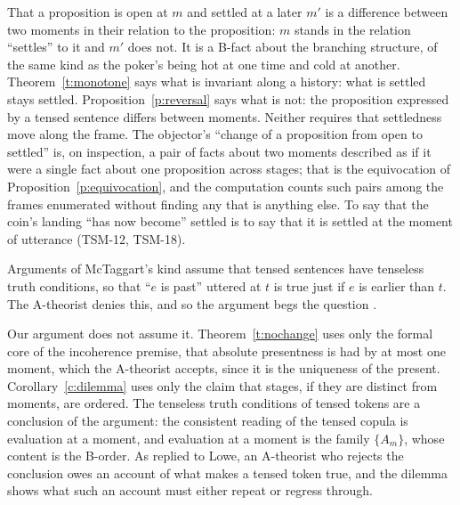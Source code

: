 \documentclass{situationist-preprint}
\begin{document}
\begin{reply}
That a proposition is open at $m$ and settled at a later $m'$ is a difference between two moments in their relation to the proposition: $m$ stands in the relation \enquote{settles} to it and $m'$ does not. It is a B-fact about the branching structure, of the same kind as the poker's being hot at one time and cold at another. Theorem~\ref{t:monotone} says what is invariant along a history: what is settled stays settled. Proposition~\ref{p:reversal} says what is not: the proposition expressed by a tensed sentence differs between moments. Neither requires that settledness move along the frame. The objector's \enquote{change of a proposition from open to settled} is, on inspection, a pair of facts about two moments described as if it were a single fact about one proposition across stages; that is the equivocation of Proposition~\ref{p:equivocation}, and the computation counts \NResolutions{} such pairs among the frames enumerated without finding any that is anything else. To say that the coin's landing \enquote{has now become} settled is to say that it is settled at the moment of utterance (TSM-12, TSM-18).
\end{reply}





\begin{objection}\label{o:lowe}
Arguments of McTaggart's kind assume that tensed sentences have tenseless truth conditions, so that \enquote{$e$ is past} uttered at $t$ is true just if $e$ is earlier than $t$. The A-theorist denies this, and so the argument begs the question \citep{Lowe1987}.
\end{objection}

\begin{reply}
Our argument does not assume it. Theorem~\ref{t:nochange} uses only the formal core of the incoherence premise, that absolute presentness is had by at most one moment, which the A-theorist accepts, since it is the uniqueness of the present. Corollary~\ref{c:dilemma} uses only the claim that stages, if they are distinct from moments, are ordered. The tenseless truth conditions of tensed tokens are a conclusion of the argument: the consistent reading of the tensed copula is evaluation at a moment, and evaluation at a moment is the family $\{A_m\}$, whose content is the B-order. As \citet{LePoidevinMellor1987} replied to Lowe, an A-theorist who rejects the conclusion owes an account of what makes a tensed token true, and the dilemma shows what such an account must either repeat or regress through.
\end{reply}
\end{document}
